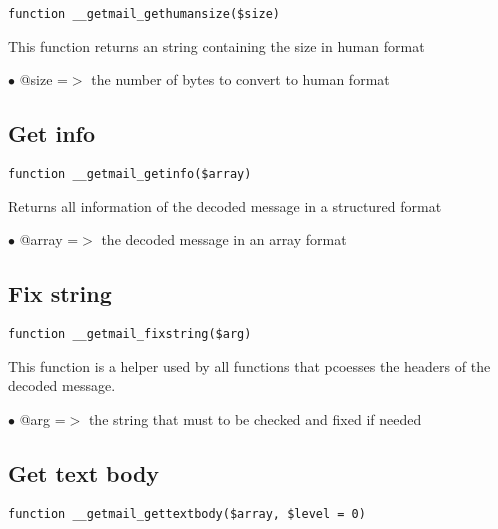 \documentclass[a4paper]{book}
\begin{document}
\begin{lstlisting}
function __getmail_gethumansize($size)
\end{lstlisting}

This function returns an string containing the size in human format

\begin{compactitem}
\item[\color{myblue}$\bullet$] @size =$>$ the number of bytes to convert to human format
\end{compactitem}

\hypertarget{toc45}{}
\subsection{Get info}

\begin{lstlisting}
function __getmail_getinfo($array)
\end{lstlisting}

Returns all information of the decoded message in a structured format

\begin{compactitem}
\item[\color{myblue}$\bullet$] @array =$>$ the decoded message in an array format
\end{compactitem}

\hypertarget{toc46}{}
\subsection{Fix string}

\begin{lstlisting}
function __getmail_fixstring($arg)
\end{lstlisting}

This function is a helper used by all functions that pcoesses the headers
of the decoded message.

\begin{compactitem}
\item[\color{myblue}$\bullet$] @arg =$>$ the string that must to be checked and fixed if needed
\end{compactitem}

\hypertarget{toc47}{}
\subsection{Get text body}

\begin{lstlisting}
function __getmail_gettextbody($array, $level = 0)
\end{lstlisting}
\end{document}
